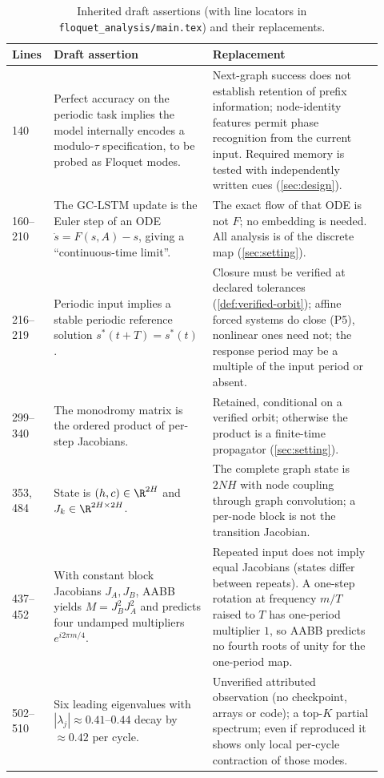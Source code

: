 \begin{table}[h]
\centering
\caption{Inherited draft assertions (with line locators in \texttt{floquet\_analysis/main.tex}) and their replacements.}
\label{tab:inherited}
\small
\begin{tabular}{p{0.07\linewidth}p{0.41\linewidth}p{0.44\linewidth}}
\toprule
Lines & Draft assertion & Replacement \\
\midrule
140 & Perfect accuracy on the periodic task implies the model internally encodes a modulo-$\tau$ specification, to be probed as Floquet modes. & Next-graph success does not establish retention of prefix information; node-identity features permit phase recognition from the current input. Required memory is tested with independently written cues (\cref{sec:design}). \\
160--210 & The GC-LSTM update is the Euler step of an ODE $\dot s=F(s,A)-s$, giving a ``continuous-time limit''. & The exact flow of that ODE is not $F$; no embedding is needed. All analysis is of the discrete map (\cref{sec:setting}). \\
216--219 & Periodic input implies a stable periodic reference solution $s^*(t+T)=s^*(t)$. & Closure must be verified at declared tolerances (\cref{def:verified-orbit}); affine forced systems do close (P5), nonlinear ones need not; the response period may be a multiple of the input period or absent. \\
299--340 & The monodromy matrix is the ordered product of per-step Jacobians. & Retained, conditional on a verified orbit; otherwise the product is a finite-time propagator (\cref{sec:setting}). \\
353, 484 & State is $(h,c)\in\R^{2H}$ and $J_k\in\R^{2H\times2H}$. & The complete graph state is $2NH$ with node coupling through graph convolution; a per-node block is not the transition Jacobian. \\
437--452 & With constant block Jacobians $J_A,J_B$, AABB yields $M=J_B^2J_A^2$ and predicts four undamped multipliers $e^{i2\pi m/4}$. & Repeated input does not imply equal Jacobians (states differ between repeats). A one-step rotation at frequency $m/T$ raised to $T$ has one-period multiplier $1$, so AABB predicts no fourth roots of unity for the one-period map. \\
502--510 & Six leading eigenvalues with $|\lambda_j|\approx0.41$--$0.44$ decay by $\approx0.42$ per cycle. & Unverified attributed observation (no checkpoint, arrays or code); a top-$K$ partial spectrum; even if reproduced it shows only local per-cycle contraction of those modes. \\

\end{tabular}
\end{table}
